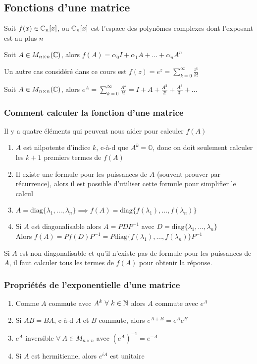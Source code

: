 \subsection{Fonctions d'une matrice}
Soit $f(x) \in \mathbb{C}_n[x]$, ou $\mathbb{C}_n[x]$ est l'espace des polynômes complexes dont l'exposant est au plus $n$
\begin{definition}
    Soit $A \in M_{n \times n}(\mathbb{C})$, alors $f(A) = \alpha_0 I + \alpha_1 A + \dots + \alpha_n A^n$
\end{definition}
Un autre cas considéré dans ce cours est $f(z) = e^z = \sum_{k = 0}^{\infty}\frac{z^k}{k!}$
\begin{definition}
    Soit $A \in M_{n \times n}(\mathbb{C})$, alors $e^A = \sum_{k = 0}^{\infty}\frac{A^k}{k!} = I + A + \frac{A^2}{2!} + \frac{A^3}{3!} + \dots$
\end{definition}

\subsubsection{Comment calculer la fonction d'une matrice}
Il y a quatre éléments qui peuvent nous aider pour calculer $f(A)$
\begin{enumerate}
    \item $A$ est nilpotente d'indice $k$, c-à-d que $A^k = \mathbb{O}$, donc on doit seulement 
    calculer les $k + 1$ premiers termes de $f(A)$
    \item Il existe une formule pour les puissances de $A$ (souvent prouver par récurrence),
    alors il est possible d'utiliser cette formule pour simplifier le calcul
    \item $A = \text{diag}\{\lambda_1, \dots, \lambda_n \} \implies f(A) = \text{diag}\{f(\lambda_1), \dots, f(\lambda_n)\}$
    \item Si $A$ est diagonalisable alors $A = PDP^{-1}$ avec $D = \text{diag}\{\lambda_1, \dots, \lambda_n\}$ \\
    Alors $f(A) = Pf(D)P^{-1} = P\text{diag}\{f(\lambda_1), \dots, f(\lambda_n)\}P^{-1}$
\end{enumerate}
\begin{remark}
    Si $A$ est non diagonalisable et qu'il n'existe pas de formule pour les puissances de $A$,
    il faut calculer tous les termes de $f(A)$ pour obtenir la réponse. 
\end{remark}

\subsubsection{Propriétés de l'exponentielle d'une matrice}
\begin{enumerate}
    \item Comme $A$ commute avec $A^k \ \forall \ k \in \mathbb{N}$ alors $A$ commute avec $e^A$
    \item Si $AB = BA$, c-à-d $A$ et $B$ commute, alors $e^{A + B} = e^A e^B$
    \item $e^A$ inversible $\forall \ A \in M_{n \times n}$ avec $\left(e^A\right)^{-1} = e^{-A}$ 
    \item Si $A$ est hermitienne, alors $e^{iA}$ est unitaire
\end{enumerate}